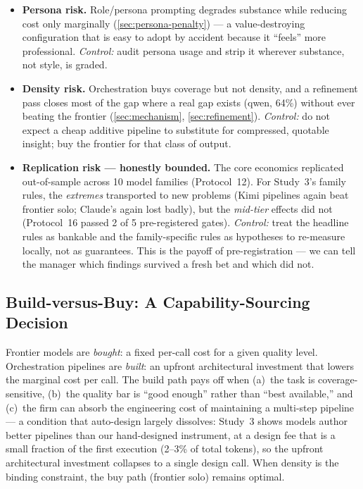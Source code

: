 \documentclass[12pt,a4paper]{article}
\begin{document}
\begin{itemize}[leftmargin=*,nosep]
  \item \textbf{Persona risk.} Role/persona prompting degrades substance while
        reducing cost only marginally (\cref{sec:persona-penalty}) --- a value-destroying
        configuration that is easy to adopt by accident because it ``feels'' more
        professional. \emph{Control:} audit persona usage and strip it wherever
        substance, not style, is graded.
  \item \textbf{Density risk.} Orchestration buys coverage but not density, and a
        refinement pass closes most of the gap where a real gap exists (qwen,
        64\%) without ever beating the frontier
        (\cref{sec:mechanism}, \cref{sec:refinement}). \emph{Control:} do not
        expect a cheap additive pipeline to substitute for compressed, quotable
        insight; buy the frontier for that class of output.
  \item \textbf{Replication risk --- honestly bounded.} The core economics
        replicated out-of-sample across 10 model families (Protocol~12). For
        Study~3's family rules, the \emph{extremes} transported to new problems
        (Kimi pipelines again beat frontier solo; Claude's again lost badly),
        but the \emph{mid-tier} effects did not (Protocol~16 passed 2 of 5
        pre-registered gates). \emph{Control:} treat the headline rules as
        bankable and the family-specific rules as hypotheses to re-measure
        locally, not as guarantees. This is the payoff of pre-registration --- we
        can tell the manager which findings survived a fresh bet and which did not.
\end{itemize}

\subsection{Build-versus-Buy: A Capability-Sourcing Decision}

Frontier models are \emph{bought}: a fixed per-call cost for a given quality
level. Orchestration pipelines are \emph{built}: an upfront architectural
investment that lowers the marginal cost per call. The build path pays off when
(a)~the task is coverage-sensitive, (b)~the quality bar is ``good enough'' rather
than ``best available,'' and (c)~the firm can absorb the engineering cost of
maintaining a multi-step pipeline --- a condition that auto-design largely
dissolves: Study~3 shows models author better pipelines than our hand-designed
instrument, at a design fee that is a small fraction of the first execution
(2--3\% of total tokens), so the upfront architectural investment collapses to
a single design call. When density is the binding constraint, the buy
path (frontier solo) remains optimal.
\end{document}
